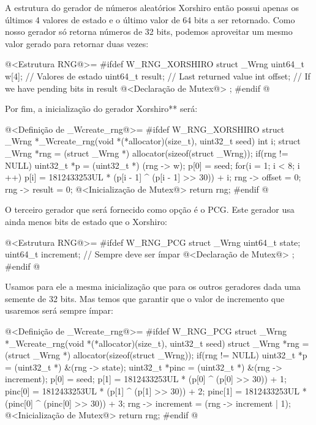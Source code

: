 A estrutura do gerador de números aleatórios Xorshiro então possui
apenas os últimos 4 valores de estado e o último valor de 64 bits a
ser retornado. Como nosso gerador só retorna números de 32 bits,
podemos aproveitar um mesmo valor gerado para retornar duas vezes:

\iniciocodigo
@<Estrutura RNG@>=
#ifdef W_RNG_XORSHIRO
struct _Wrng{
  uint64_t w[4];        // Valores de estado
  uint64_t result; // Last returned value
  int offset;      // If we have pending bits in result 
  @<Declaração de Mutex@>
};
#endif
@
\fimcodigo

Por fim, a inicialização do gerador Xorshiro** será:

\iniciocodigo
@<Definição de \_Wcreate\_rng@>=
#ifdef W_RNG_XORSHIRO
struct _Wrng *_Wcreate_rng(void *(*allocator)(size_t), uint32_t seed){
  int i;
  struct _Wrng *rng = (struct _Wrng *) allocator(sizeof(struct _Wrng));
  if(rng != NULL){
    uint32_t *p = (uint32_t *) (rng -> w);
    p[0] = seed;
    for(i = 1; i < 8; i ++)
      p[i] = 1812433253UL * (p[i - 1] ^ (p[i - 1] >> 30)) + i;
    rng -> offset = 0;
    rng -> result = 0;
    @<Inicialização de Mutex@>
  }
  return rng;
}
#endif
@
\fimcodigo


O terceiro gerador que será fornecido como opção é o PCG. Este gerador
usa ainda menos bits de estado que o Xorshiro:

\iniciocodigo
@<Estrutura RNG@>=
#ifdef W_RNG_PCG
struct _Wrng{
  uint64_t state;
  uint64_t increment; // Sempre deve ser ímpar
  @<Declaração de Mutex@>
};
#endif
@
\fimcodigo

Usamos para ele a mesma inicialização que para os outros geradores
dada uma semente de 32 bits. Mas temos que garantir que o valor de
incremento que usaremos será sempre ímpar:

\iniciocodigo
@<Definição de \_Wcreate\_rng@>=
#ifdef W_RNG_PCG
struct _Wrng *_Wcreate_rng(void *(*allocator)(size_t), uint32_t seed){
  struct _Wrng *rng = (struct _Wrng *) allocator(sizeof(struct _Wrng));
  if(rng != NULL){
    uint32_t *p = (uint32_t *) &(rng -> state);
    uint32_t *pinc = (uint32_t *) &(rng -> increment);
    p[0] = seed;
    p[1] = 1812433253UL * (p[0] ^ (p[0] >> 30)) + 1;
    pinc[0] = 1812433253UL * (p[1] ^ (p[1] >> 30)) + 2;
    pinc[1] = 1812433253UL * (pinc[0] ^ (pinc[0] >> 30)) + 3;
    rng -> increment = (rng -> increment | 1);
    @<Inicialização de Mutex@>
  }
  return rng;
}
#endif
@
\fimcodigo

